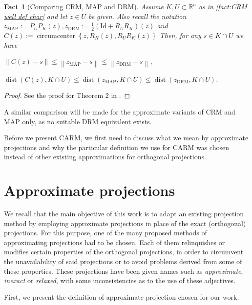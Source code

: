 \documentclass[smallextended,numbook,nospthms]{svjour3}
\theoremstyle{plain}
\newtheorem{fact}[theorem]{Fact}
\theoremstyle{definition}
\def\RR{\mathds R}
\DeclareMathOperator{\dist}{dist}
\begin{document}
\begin{fact}[Comparing CRM, MAP and DRM]
Assume $K, U \subset \RR^{n}$ as in \cref{fact:CRM well def char} and let $z \in U$ be given. Also recall the notation $z_{\mathrm{MAP}}:=P_{U} P_{K}(z), z_{\mathrm{DRM}}:=\frac{1}{2}\left(\mathrm{Id}+R_{U} R_{K}\right)(z)$ and $C(z):=\operatorname{circumcenter}\left\{z, R_{K}(z), R_{U} R_{K}(z)\right\}$
Then, for any $s \in K \cap U$ we have
\begin{listi}
	\item $\|C(z)-s\| \leq\left\|z_{\mathrm{MAP}}-s\right\| \leq\left\|z_{\mathrm{DRM}}-s\right\|$,
	\item $\dist(C(z), K \cap U) \leq \dist\left(z_{\mathrm{MAP}}, K \cap U\right) \leq \dist\left(z_{\mathrm{DRM}}, K \cap U\right)$.
\end{listi}
\end{fact}
\begin{proof}
	See the proof for Theorem 2 in \cite{Behling:2020}.
\end{proof}

A similar comparison will be made for the approximate variants of CRM and MAP only, as no suitable DRM equivalent exists.

Before we present CARM, we first need to discuss what we mean by approximate projections and why the particular definition we use for CARM was chosen instead of other existing approximations for orthogonal projections.

\newpage
\section{Approximate projections}\label{sec:approx proj}

We recall that the main objective of this work is to adapt an existing projection method by employing approximate projections in place of the exact (orthogonal) projections. For this purpose, one of the many proposed methods of approximating projections had to be chosen. 
Each of them relinquishes or modifies certain properties of the orthogonal projections, in order to circumvent the unavailability of said projections or to avoid problems derived from some of these properties. These projections have been given names such as \emph{approximate}, \emph{inexact} or \emph{relaxed}, with some inconsistencies as to the use of these adjectives.

First, we present the definition of approximate projection chosen for our work.
\end{document}
